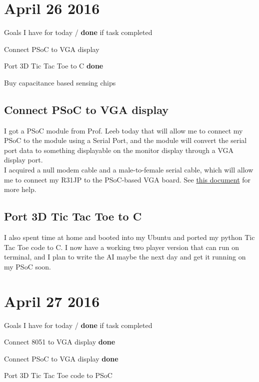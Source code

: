\documentclass[12pt,twoside]{article}
\newenvironment{tight_itemize}{
\begin{itemize}
  \setlength{\itemsep}{0pt}
  \setlength{\parskip}{0pt}
}{\end{itemize}}
\begin{document}

\newpage
\section{April 26 2016}

Goals I have for today / {\bf done} if task completed
\begin{tight_itemize}
\item Connect PSoC to VGA display %
\item Port 3D Tic Tac Toe to C {\bf done}
\item Buy capacitance based sensing chips
\end{tight_itemize}

\subsection{Connect PSoC to VGA display}
I got a PSoC module from Prof. Leeb today that will allow me to connect my PSoC to the module using a Serial Port, and the module will convert the serial port data to something displayable on the monitor display through a VGA display port. 
\\ I acquired a null modem cable and a male-to-female serial cable, which will allow me to connect my R31JP to the PSoC-based VGA board. See \href{http://web.mit.edu/6.115/www/document/psoc_vga_manual.pdf}{this document} for more help.

\subsection{Port 3D Tic Tac Toe to C}
I also spent time at home and booted into my Ubuntu and ported my python Tic Tac Toe code to C. I now have a working two player version that can run on terminal, and I plan to write the AI maybe the next day and get it running on my PSoC soon. 



\section{April 27 2016}

Goals I have for today / {\bf done} if task completed
\begin{tight_itemize}
\item Connect 8051 to VGA display {\bf done}
\item Connect PSoC to VGA display {\bf done}
\item Port 3D Tic Tac Toe code to PSoC
\end{tight_itemize}
\end{document}
